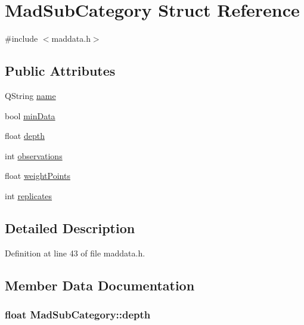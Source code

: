 \hypertarget{struct_mad_sub_category}{\section{Mad\-Sub\-Category Struct Reference}
\label{struct_mad_sub_category}
}


{\ttfamily \#include $<$maddata.\-h$>$}

\subsection*{Public Attributes}
\begin{DoxyCompactItemize}
\item 
Q\-String \hyperlink{struct_mad_sub_category_a0f0d32eb25cfe2236b5b68a65f3bda0a}{name}
\item 
bool \hyperlink{struct_mad_sub_category_a3728af78f99ce0a8c3be3165626862db}{min\-Data}
\item 
float \hyperlink{struct_mad_sub_category_a5514fc9730d13a3c18eaf002bf96bd72}{depth}
\item 
int \hyperlink{struct_mad_sub_category_a7ac12663efbd43f8bb85449c4783523d}{observations}
\item 
float \hyperlink{struct_mad_sub_category_a5aa8b532f2decce8a584b7cbb2b0816c}{weight\-Points}
\item 
int \hyperlink{struct_mad_sub_category_aa2238ad9a0d06d1d35c88c6c6c508270}{replicates}
\end{DoxyCompactItemize}


\subsection{Detailed Description}


Definition at line 43 of file maddata.\-h.



\subsection{Member Data Documentation}
\hypertarget{struct_mad_sub_category_a5514fc9730d13a3c18eaf002bf96bd72}{
\subsubsection[{depth}]{\setlength{\rightskip}{0pt plus 5cm}float Mad\-Sub\-Category\-::depth}}\label{struct_mad_sub_category_a5514fc9730d13a3c18eaf002bf96bd72}


